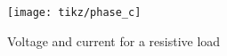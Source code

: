 \begin{figure}
	\centering
	\texttt{[image: tikz/phase\_c]}
	\caption[Voltage and current for a resistive load]{Voltage and current for a resistive load}
	\label{fig:hart1}
\end{figure}
